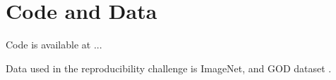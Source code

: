 \documentclass{article}
\theoremstyle{plain}
\theoremstyle{definition}
\theoremstyle{remark}
\begin{document}
\section*{Code and Data}

\todo

Code is available at ...

Data used in the reproducibility challenge is ImageNet, and GOD dataset \cite{horikawa2016}.

%
%





\end{document}
